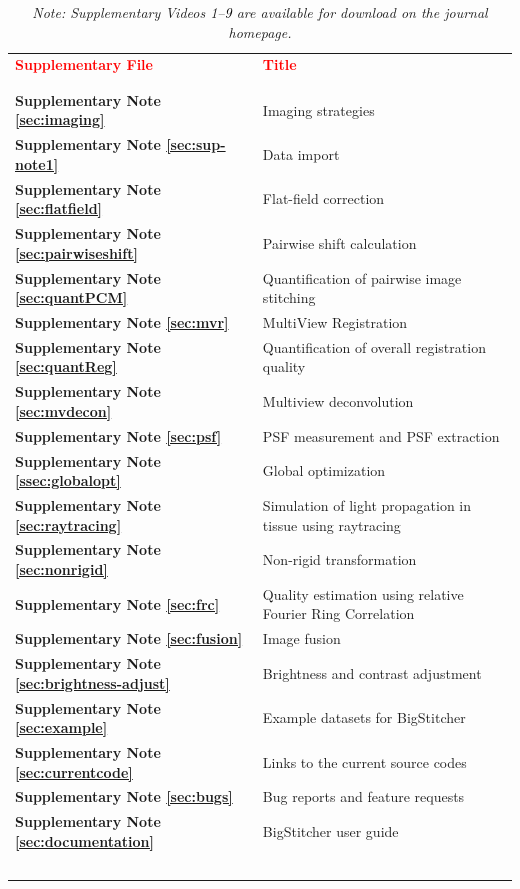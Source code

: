 \documentclass[]{spie}  %
\def\red{\textcolor{black}}
\newcommand\tablespace{\vspace{2.5mm}}
\begin{document}
\pagebreak

\begin{table}[h!]
\center
{
\fontsize{12pt}{11pt}\selectfont
\center
\begin{tabular}{lp{11cm}}
\textbf{\textcolor{red}{Supplementary File}} & \textbf{\textcolor{red}{Title}}\\ \\
\hline
\\

\textbf{Supplementary Note \ref{sec:imaging}} & Imaging strategies \tablespace \\
\textbf{Supplementary Note \ref{sec:sup-note1}} & Data import \tablespace \\
\textbf{Supplementary Note \ref{sec:flatfield}} & Flat-field correction \tablespace \\
\textbf{Supplementary Note \ref{sec:pairwiseshift}} & Pairwise shift calculation \tablespace \\
\textbf{Supplementary Note \ref{sec:quantPCM}} & Quantification of pairwise image stitching \tablespace \\
\textbf{Supplementary Note \ref{sec:mvr}} & MultiView Registration \tablespace \\
\textbf{Supplementary Note \ref{sec:quantReg}} & Quantification of overall registration quality \tablespace \\
\textbf{Supplementary Note \ref{sec:mvdecon}} & Multiview deconvolution \tablespace \\
\textbf{Supplementary Note \ref{sec:psf}} & PSF measurement and PSF extraction \tablespace \\
\textbf{Supplementary Note \ref{ssec:globalopt}} & Global optimization \tablespace \\
\textbf{Supplementary Note \ref{sec:raytracing}} & Simulation of light propagation in tissue using raytracing \tablespace \\
\textbf{Supplementary Note \ref{sec:nonrigid}} & Non-rigid transformation \tablespace \\
\textbf{Supplementary Note \ref{sec:frc}} & Quality estimation using relative Fourier Ring Correlation \tablespace \\
\textbf{Supplementary Note \ref{sec:fusion}} & Image fusion \tablespace \\
\textbf{Supplementary Note \ref{sec:brightness-adjust}} & Brightness and contrast adjustment \tablespace \\
\textbf{Supplementary Note \ref{sec:example}} & Example datasets for BigStitcher \tablespace \\
\textbf{Supplementary Note \ref{sec:currentcode}} & Links to the current source codes \tablespace \\
\textbf{Supplementary Note \ref{sec:bugs}} & Bug reports and feature requests \tablespace \\
\textbf{Supplementary Note \ref{sec:documentation}} & BigStitcher user guide \tablespace \\
\textbf{~} & {~} \tablespace \\
\end{tabular}}
\caption{\emph{Note: Supplementary Videos 1--\red{9} are available for download on the journal homepage.}}
\end{table}
\end{document}
